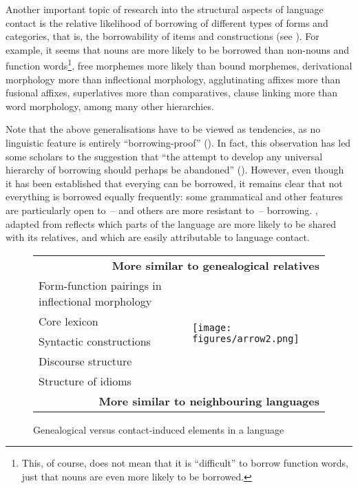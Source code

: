Another important topic of research into the structural aspects of language contact is the relative likelihood of borrowing of different types of forms and categories, that is, the borrowability of items and constructions (see \cite{haspelmathtadmor09wold,moravcsik1978universalscontact,thomasonkaufman1988,vanhoutmuysken1944borrow,field2002borrow,matras2011universals}). For example, it seems that nouns are more likely to be borrowed than non-nouns and function words\footnote{This, of course, does not mean that it is “difficult” to borrow function words, just that nouns are even more likely to be borrowed.}, free morphemes more likely than bound morphemes, derivational morphology more than inflectional morphology, agglutinating affixes more than fusional affixes, superlatives more than comparatives, clause linking more than word morphology, among many other hierarchies.

Note that the above generalisations have to be viewed as tendencies, as no linguistic feature is entirely “borrowing\hyp proof” (\cite[2]{aikhenvald2006contactintro}). In fact, this observation has led some scholars to the suggestion that “the attempt to develop any universal hierarchy of borrowing should perhaps be abandoned” (\cite{curnow2001borrowed}). However, even though it has been established that everying can be borrowed, it remains clear that not everything is borrowed equally frequently: some grammatical and other features are particularly open to~-- and others are more resistant to~-- borrowing. , adapted from \textcite{owens1996sprachkontakt} reflects which parts of the language are more likely to be shared with its relatives, and which are easily attributable to language contact.

\begin{figure}
		\begin{tabular}{ll}
			
			\multicolumn{2}{r}{\textbf{More similar to genealogical relatives}} \\
			
			Form-function pairings in inflectional morphology & \multirow{5}{4em}{\texttt{[image: figures/arrow2.png]}} \\ 
			Core lexicon &  \\
			Syntactic constructions &  \\
			Discourse structure &  \\
			Structure of idioms &  \\
            \multicolumn{2}{r}{\textbf{More similar to neighbouring languages}}  \\
			
			
		\end{tabular}
	\caption{Genealogical versus contact-induced elements in a language}
	\label{owens-elements-table}
\end{figure}



